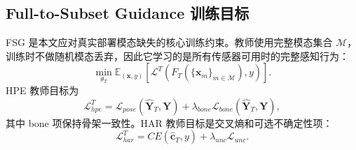 \documentclass[UTF8,twocolumn]{ctexart}
\begin{document}
\subsection{Full-to-Subset Guidance 训练目标}
FSG 是本文应对真实部署模态缺失的核心训练约束。教师使用完整模态集合 $\mathcal{M}$，训练时不做随机模态丢弃，因此它学习的是所有传感器可用时的完整感知行为：
\begin{equation}
    \min_{\theta_T}\mathbb{E}_{(\mathbf{x},y)}
    \left[
    \mathcal{L}^{T}(F_T(\{\mathbf{x}_m\}_{m\in\mathcal{M}}),y)
    \right].
\end{equation}
HPE 教师目标为
\begin{equation}
    \mathcal{L}^{T}_{hpe}
    =
    \mathcal{L}_{pose}(\hat{\mathbf{Y}}_T,\mathbf{Y})
    +
    \lambda_{bone}\mathcal{L}_{bone}(\hat{\mathbf{Y}}_T,\mathbf{Y}),
\end{equation}
其中 bone 项保持骨架一致性。HAR 教师目标是交叉熵和可选不确定性项：
\begin{equation}
    \mathcal{L}^{T}_{har}
    =
    CE(\hat{\mathbf{c}}_T,y)+\lambda_{unc}\mathcal{L}_{unc}.
\end{equation}
\end{document}
